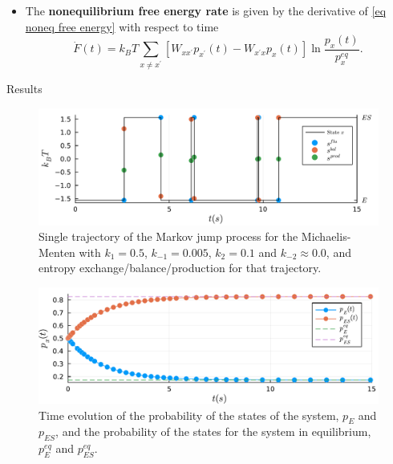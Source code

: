 \documentclass[final]{beamer}
\newlength{\colwidth}
\begin{document}
\begin{frame}[t]
\begin{columns}[t]
\begin{column}{\colwidth}
\begin{itemize}
\item The {\bf nonequilibrium free energy rate} is given by the derivative of \eqref{eq noneq free energy} with respect to time 
\begin{equation*}
\dot{F}(t) = k_B T \sum_{x \neq x^\prime} \left[W_{x x^\prime}p_{x^\prime}(t) -  W_{x^\prime x} p_x(t)  \right] \ln \frac{p_x(t)}{p_x^{eq}}.
\end{equation*}
\end{itemize}
\begin{block}{Results}
\begin{figure}
\begin{center}
%
\includegraphics[scale=1.2]{graphics/f8.pdf}
\end{center}
\caption{\justifying Single trajectory of the Markov jump process for the Michaelis-Menten with $k_{1} = 0.5$, $k_{-1} = 0.005$, $k_{2} = 0.1$ and $k_{-2} \approx 0.0$, and entropy exchange/balance/production for that trajectory.}\label{fig transition}
\end{figure}
\begin{figure}
\begin{center}
%
\includegraphics[scale=1.2]{graphics/f1.pdf}
\end{center}
\label{fig 2-state-system}
\caption{\justifying  Time evolution of the probability of the states of the system, $p_E$ and $p_{ES}$, and the probability of the states for the system in equilibrium, $p_E^{eq}$ and $p_{ES}^{eq}$.}
\end{figure}


\end{block}
\end{column}
\end{columns}
\end{frame}
\end{document}
